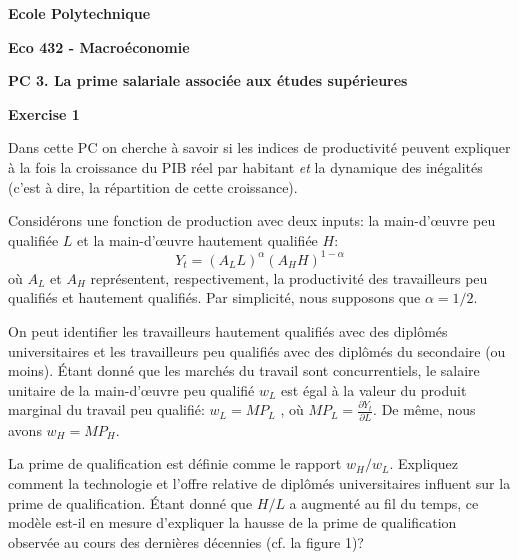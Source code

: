 \documentclass[11pt,a4paper]{article}
\begin{document}
\begin{center}
\textbf{Ecole Polytechnique}

\bigskip

\textbf{Eco 432 - Macro\'{e}conomie}

\bigskip

\textbf{PC 3. La prime salariale associée aux études supérieures}

\hspace{1.0in}
\end{center}


\begin{center}
\textbf{Exercise 1}
\end{center}


Dans cette PC on cherche à savoir si les indices de productivité peuvent expliquer à la fois la croissance du PIB réel par habitant \textit{et} la dynamique des inégalités (c'est à dire, la répartition de cette croissance).

Considérons une fonction de production avec deux inputs: la main-d'œuvre peu qualifiée $L$ et la main-d'œuvre hautement qualifiée $H$:
\begin{equation}\label{cd}
Y_t= (A_L L)^{\alpha}  (A_H H)^{1-\alpha}
\end{equation}
où $A_L$ et $A_H$ représentent, respectivement, la productivité des travailleurs peu qualifiés et hautement qualifiés. Par simplicité, nous supposons que $\alpha =1/2$.

On peut identifier les travailleurs hautement qualifiés avec des diplômés universitaires et les travailleurs peu qualifiés avec des diplômés du secondaire (ou moins).
Étant donné que les marchés du travail sont concurrentiels, le salaire unitaire de la main-d'œuvre peu qualifié $w_L$ est égal à la valeur du produit marginal du travail peu qualifié: $w_L = MP_L$ , où $MP_L=\frac{\partial Y_t}{\partial L}$. De même, nous avons $w_H = MP_H$.

\bigskip 
La prime de qualification est définie comme le rapport $w_H/w_L$. Expliquez comment la technologie et l'offre relative de diplômés universitaires   influent sur la prime de qualification. Étant donné que $H/L$ a augmenté au fil du temps, ce modèle est-il en mesure d'expliquer la hausse de la  prime de qualification observée au cours des dernières décennies (cf. la figure 1)?
\end{document}
